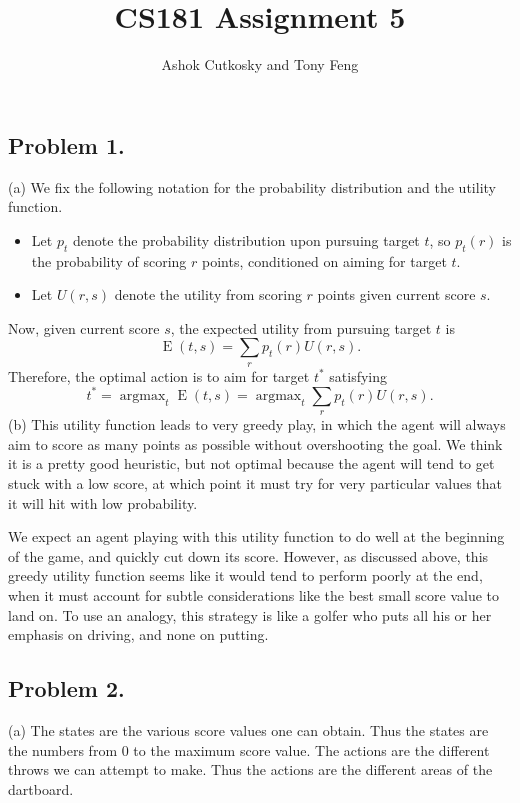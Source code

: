 \documentclass[12pt]{article}
\title{CS181 Assignment 5}
\author{Ashok Cutkosky and Tony Feng}
\DeclareMathOperator{\argmax}{argmax}
\DeclareMathOperator{\E}{E}
\theoremstyle{remark}
\begin{document}
\maketitle

\subsection*{Problem 1.} (a) We fix the following notation for the probability distribution and the utility function. 
\begin{itemize}
\item Let $p_t$ denote the probability distribution upon pursuing target $t$, so $p_t(r)$ is the probability of scoring $r$ points, conditioned on aiming for target $t$. 
\item Let $U(r, s)$ denote the utility from scoring $r$ points given current score $s$. 
\end{itemize} 
Now, given current score $s$, the expected utility from pursuing target $t$ is 
\[
\E(t,s) = \sum_r p_t(r) U(r,s).
\]
Therefore, the optimal action is to aim for target $t^*$ satisfying 
\[
t^* = \displaystyle\argmax_t \E(t,s) = \argmax_t \sum_r p_t(r) U(r,s).
\]
(b) This utility function leads to very greedy play, in which the agent will always aim to score as many points as possible without overshooting the goal. We think it is a pretty good heuristic, but not optimal because the agent will tend to get stuck with a low score, at which point it must try for very particular values that it will hit with low probability. 

We expect an agent playing with this utility function to do well at the beginning of the game, and quickly cut down its score. However, as discussed above, this greedy utility function seems like it would tend to perform poorly at the end, when it must account for subtle considerations like the best small score value to land on. To use an analogy, this strategy is like a golfer who puts all his or her emphasis on driving, and none on putting. \\



\subsection*{Problem 2.} (a) The states are the various score values one can obtain. Thus the states are the numbers from 0 to the maximum score value. The actions are the different throws we can attempt to make. Thus the actions are the different areas of the dartboard.
\end{document}

